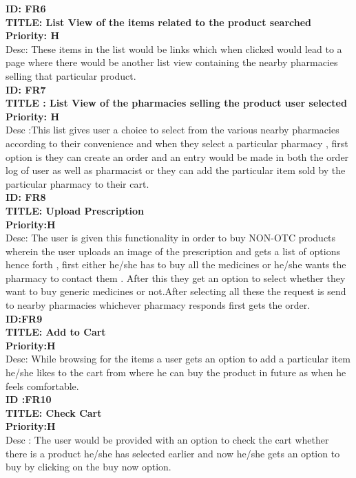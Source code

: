 \documentclass{scrreprt}
\begin{document}
\textbf{ID: FR6}  \\
\textbf{TITLE: List View of the items related to the product searched}   \\
\textbf{Priority: H}   \\
Desc: These items in the list would be links which when clicked would lead to a page where there would be another list view containing the nearby pharmacies selling that particular product.   \\

\textbf{ID: FR7}   \\
\textbf{TITLE : List View of the pharmacies selling the product user selected}  \\
\textbf{Priority: H}   \\
Desc :This list gives user a choice to select from the various nearby pharmacies according to their convenience and when they select a particular pharmacy , first option is they can create an order  and an entry would be made in both the order log of user as well as pharmacist or they can add the particular item sold by the particular pharmacy to their cart.   \\

\textbf{ID: FR8}   \\
\textbf{TITLE: Upload Prescription}   \\
\textbf{Priority:H}  \\
Desc: The user is given this functionality in order to buy NON-OTC products wherein the user uploads an image of the prescription and gets a list of options hence forth , first  either he/she has to buy all the medicines  or he/she wants the pharmacy to contact them . After this they get an option to select whether they want to buy generic medicines or not.After selecting all these the request is send to nearby pharmacies whichever pharmacy responds first gets the order.  \\

\textbf{ID:FR9}   \\
\textbf{TITLE: Add to Cart}  \\
\textbf{Priority:H}   \\
Desc: While browsing for the items a user gets an option to add a particular item he/she likes to the cart from where he can buy the product in future as when he feels comfortable.  \\

\textbf{ID :FR10}  \\
\textbf{TITLE: Check Cart}  \\
\textbf{Priority:H}  \\
Desc : The user would be provided with an  option to check the cart whether there is a product he/she has selected earlier and now he/she gets an option to buy by clicking on the buy now option.  \\
\end{document}
